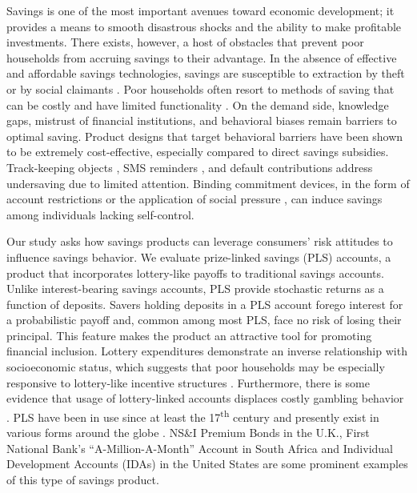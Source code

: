 \documentclass[11pt]{article}
\begin{document}
	Savings is one of the most important avenues toward economic development; it provides a means to smooth disastrous shocks and the ability to make profitable investments. There exists, however, a host of obstacles that prevent poor households from accruing savings to their advantage. In the absence of effective and affordable savings technologies, savings are susceptible to extraction by theft or by social claimants . Poor households often resort to methods of saving that can be costly and have limited functionality . On the demand side, knowledge gaps, mistrust of financial institutions, and behavioral biases remain barriers to optimal saving. Product designs that target behavioral barriers have been shown to be extremely cost-effective, especially compared to direct savings subsidies. Track-keeping objects , SMS reminders , and default contributions  address undersaving due to limited attention. Binding commitment devices, in the form of account restrictions  or the application of social pressure , can induce savings among individuals lacking self-control.

	Our study asks how savings products can leverage consumers' risk attitudes to influence savings behavior. We evaluate prize-linked savings (PLS) accounts, a product that incorporates lottery-like payoffs to traditional savings accounts. Unlike interest-bearing savings accounts, PLS provide stochastic returns as a function of deposits. Savers holding deposits in a PLS account forego interest for a probabilistic payoff and, common among most PLS, face no risk of losing their principal. This feature makes the product an attractive tool for promoting financial inclusion. Lottery expenditures demonstrate an inverse relationship with socioeconomic status, which suggests that poor households may be especially responsive to lottery-like incentive structures . Furthermore, there is some evidence that usage of lottery-linked accounts displaces costly gambling behavior . PLS have been in use since at least the 17\textsuperscript{th} century and presently exist in various forms around the globe . NS\&I Premium Bonds in the U.K., First National Bank's ``A-Million-A-Month'' Account in South Africa and Individual Development Accounts (IDAs) in the United States are some prominent examples of this type of savings product.
\end{document}
